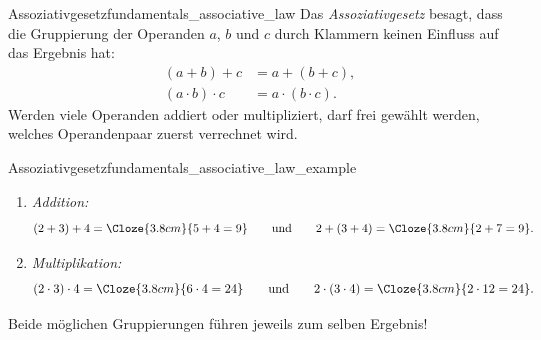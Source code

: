 \noindent\begin{minipage}{\linewidth}
\begin{DefinitionBox}{Assoziativgesetz}{fundamentals_associative_law}
  Das \emph{Assoziativgesetz}  besagt, dass die
  Gruppierung der Operanden $a$, $b$ und $c$ durch Klammern keinen Einfluss auf
  das Ergebnis hat:
  \begin{align*}
    (a+b)+c &= a+(b+c), \\
    (a\cdot b)\cdot c &= a\cdot(b\cdot c).
  \end{align*}
  Werden viele Operanden addiert oder multipliziert, darf frei gewählt werden,
  welches Operandenpaar zuerst verrechnet wird.
\end{DefinitionBox}

\begin{ExampleBox}{Assoziativgesetz}{fundamentals_associative_law_example}
  \begin{enumerate}[label=\alph*),itemsep=0.8em]
    \item \emph{Addition:}
      \[
        (2+3)+4=\Cloze{3.8cm}{5+4=9}
        \qquad\text{und}\qquad
        2+(3+4)=\Cloze{3.8cm}{2+7=9}.
      \]
    \item \emph{Multiplikation:}
      \[
        (2\cdot 3)\cdot 4=\Cloze{3.8cm}{6\cdot 4=24}
        \qquad\text{und}\qquad
        2\cdot(3\cdot 4)=\Cloze{3.8cm}{2\cdot 12=24}.
      \]
  \end{enumerate}
  Beide möglichen Gruppierungen führen jeweils zum selben Ergebnis!
\end{ExampleBox}
\end{minipage}

\vspace{1cm}

